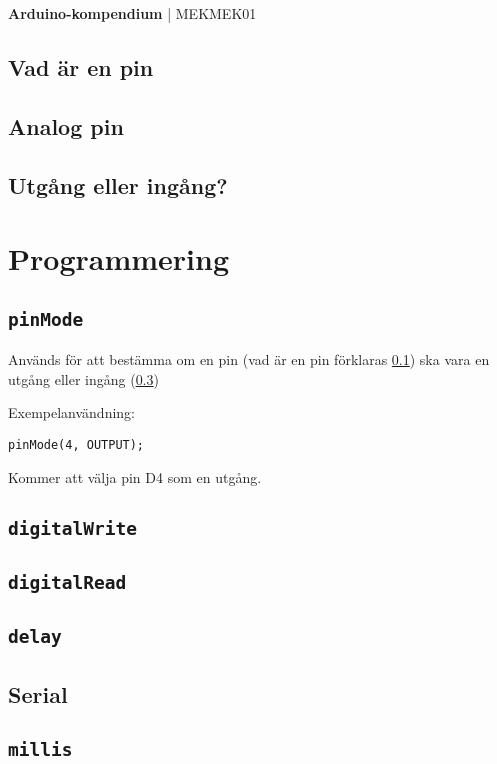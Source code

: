\documentclass[11pt]{article}
\begin{document}
\begin{center}
      \textbf{\huge{Arduino-kompendium}}
      \huge{| MEKMEK01}
\end{center}
\vspace{2em}

\tableofcontents

\newpage

\subsection{Vad är en pin}\label{sec:pin}
\subsection{Analog pin}
\subsection{Utgång eller ingång?}\label{sec:io}

\section{Programmering}
\subsection{\texttt{pinMode}}
Används för att bestämma om en pin (vad är en pin förklaras \ref{sec:pin}) ska vara en utgång eller ingång (\ref{sec:io})

Exempelanvändning:
\begin{lstlisting}
pinMode(4, OUTPUT);
\end{lstlisting}
Kommer att välja pin D4 som en utgång.

\subsection{\texttt{digitalWrite}}

\subsection{\texttt{digitalRead}}

\subsection{\texttt{delay}}

\subsection{Serial}

\subsection{\texttt{millis}}
\end{document}
